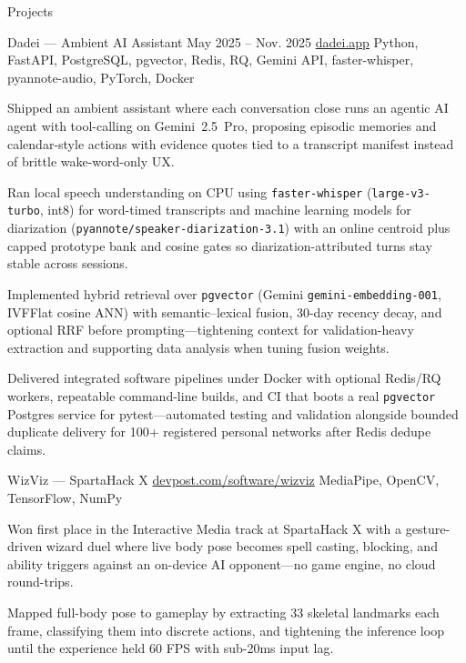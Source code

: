 \documentclass[
	11pt
]{../../../resume}
\begin{document}
	\begin{rSection}{P}{rojects}
		\begin{rSectionEntry}
			{Dadei --- Ambient AI Assistant}
			{May 2025 -- Nov. 2025}
			{\href{https://dadei.app}{dadei.app}}
			{Python, FastAPI, PostgreSQL, pgvector, Redis, RQ, Gemini API, faster-whisper, pyannote-audio, PyTorch, Docker}
			{}

			\item Shipped an ambient assistant where each conversation close runs an agentic AI agent with tool-calling on Gemini~2.5~Pro, proposing episodic memories and calendar-style actions with evidence quotes tied to a transcript manifest instead of brittle wake-word-only UX.
			\item Ran local speech understanding on CPU using \texttt{faster-whisper} (\texttt{large-v3-turbo}, int8) for word-timed transcripts and machine learning models for diarization (\texttt{pyannote/speaker-diarization-3.1}) with an online centroid plus capped prototype bank and cosine gates so diarization-attributed turns stay stable across sessions.
			\item Implemented hybrid retrieval over \texttt{pgvector} (Gemini \texttt{gemini-embedding-001}, IVFFlat cosine ANN) with semantic--lexical fusion, 30-day recency decay, and optional RRF before prompting---tightening context for validation-heavy extraction and supporting data analysis when tuning fusion weights.
			\item Delivered integrated software pipelines under Docker with optional Redis/RQ workers, repeatable command-line builds, and CI that boots a real \texttt{pgvector} Postgres service for pytest---automated testing and validation alongside bounded duplicate delivery for 100+ registered personal networks after Redis dedupe claims.
		\end{rSectionEntry}

		\begin{rSectionEntry}
			{WizViz --- SpartaHack X}
			{\href{https://devpost.com/software/wizviz}{devpost.com/software/wizviz}}
			{}
			{MediaPipe, OpenCV, TensorFlow, NumPy}
			{}

			\item Won first place in the Interactive Media track at SpartaHack X with a gesture-driven wizard duel where live body pose becomes spell casting, blocking, and ability triggers against an on-device AI opponent---no game engine, no cloud round-trips.
			\item Mapped full-body pose to gameplay by extracting 33 skeletal landmarks each frame, classifying them into discrete actions, and tightening the inference loop until the experience held 60 FPS with sub-20ms input lag.
		\end{rSectionEntry}
	\end{rSection}
\end{document}
